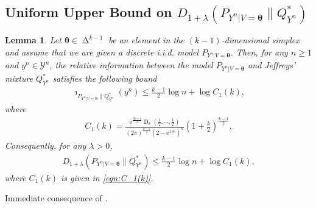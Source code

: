 \documentclass[journal, 10pt]{IEEEtran}
\newcommand{\rme}{\mathrm{e}}
\newcommand{\cY}{\mathcal{Y}}
\theoremstyle{plain}
\theoremstyle{plain}
\newtheorem{lem}{Lemma}%
\theoremstyle{plain}
\theoremstyle{plain}
\newcommand{\boldtheta}{\mathbold{\theta}}
\newcommand{\opD}{\operatorname{D}}
\newcommand{\simplex}{\operatorname{\Delta}}
\begin{document}
\begin{appendices}
\section{Uniform Upper Bound on $D_{1+\lambda }\left( P_{Y^n|V=\boldtheta} \| Q_{Y^n}^{\ast}\right)$} \label{appdx:uniform upp bd on renyi div}
\begin{lem} \label{lem:uniform_upper_bd_on_renyi_divergence_btw_model_and_jeff_mix}
Let $\boldtheta \in \simplex^{k-1}$ be an element in the $(k-1)$-dimensional simplex and assume that we are given a discrete i.i.d. model $P_{Y^n|V=\boldtheta}$. Then, for any $n\ge 1$ and $y^n \in \cY^n$, the relative information between the model $P_{Y^n|V=\boldtheta}$ and Jeffreys' mixture $Q_{Y^n}^{\ast}$ satisfies the following bound
\begin{align}
\imath_{P_{Y^n|V=\boldtheta}\| Q_{Y^n}^{\ast}} (y^n)
\le
 \frac{k-1}{2}\log n +\log C_1(k)\text{,}
\end{align}
where 
\begin{align}
C_1(k)=
\frac{\rme^{\frac{6k+1}{12}}\opD_k\left(\frac{1}{2}, \cdots, \frac{1}{2}\right)}{
\left(2\pi\right)^{\frac{k-1}{2}}\left(2-\rme^{1/6}\right)^k  } \left(1+\frac{k}{2} \right)^{\frac{k-1}{2}}\text{.} \label{eqn:C_1(k)}
\end{align}
Consequently, for any $\lambda > 0 $,
\begin{align}
D_{1+\lambda }\left( P_{Y^n|V=\boldtheta} \| Q_{Y^n}^{\ast}\right)
\le 
\frac{k-1}{2}\log n + \log C_1(k)\text{,}
\end{align}
where $C_1(k)$ is given in \eqref{eqn:C_1(k)}.
\end{lem}

\begin{IEEEproof}
Immediate consequence of \cite[Lemma 4]{XieBarron1997}.
\end{IEEEproof}

\end{appendices}
\end{document}
